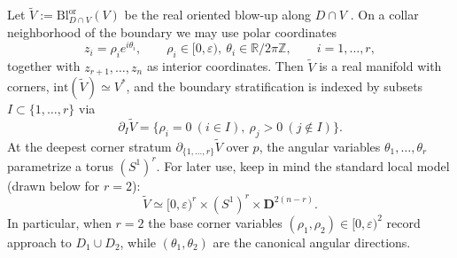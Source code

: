 \documentclass[11pt]{amsart}
\theoremstyle{plain}
\theoremstyle{definition}
\newcommand{\Blor}{\mathrm{Bl}^{\mathrm{or}}}
\theoremstyle{definition}
\begin{document}
Let $\widetilde V:=\Blor_{D\cap V}(V)$ be the real oriented blow-up along $D\cap V$ \cite{Sabbah13}.
On a collar neighborhood of the boundary we may use polar coordinates
\begin{equation}\label{eq:polar}
z_i=\rho_i e^{i\theta_i},
\qquad
\rho_i\in[0,\varepsilon),
\ \theta_i\in\mathbb R/2\pi\mathbb Z,
\qquad
i=1,\dots,r,
\end{equation}
together with $z_{r+1},\dots,z_n$ as interior coordinates. Then $\widetilde V$ is a real manifold with corners,
$\mathrm{int}(\widetilde V)\simeq V^*$, and the boundary stratification is indexed by subsets
$I\subset\{1,\dots,r\}$ via
\[
\partial_I\widetilde V=\{\rho_i=0\ (i\in I),\ \rho_j>0\ (j\notin I)\}.
\]
At the deepest corner stratum $\partial_{\{1,\dots,r\}}\widetilde V$ over $p$, the angular variables
$\theta_1,\dots,\theta_r$ parametrize a torus $(S^1)^r$.
For later use, keep in mind the standard local model (drawn below for $r=2$):
\[
\widetilde V \simeq [0,\varepsilon)^r\times (S^1)^r \times \mathbf D^{2(n-r)}.
\]
In particular, when $r=2$ the base corner variables $(\rho_1,\rho_2)\in[0,\varepsilon)^2$ record approach to
$D_1\cup D_2$, while $(\theta_1,\theta_2)$ are the canonical angular directions.
\end{document}
